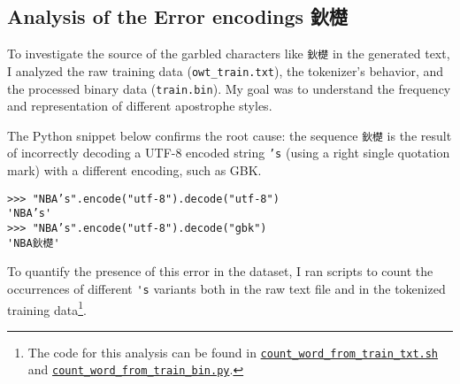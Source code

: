 \subsection{Analysis of the Error encodings 鈥檚}
\label{appendix:error-encoding}

To investigate the source of the garbled characters like \lstinline{鈥檚} in the generated text, I analyzed the raw training data (\lstinline{owt_train.txt}), the tokenizer's behavior, and the processed binary data (\lstinline{train.bin}). My goal was to understand the frequency and representation of different apostrophe styles.

The Python snippet below confirms the root cause: the sequence \lstinline{鈥檚} is the result of incorrectly decoding a UTF-8 encoded string \lstinline{’s} (using a right single quotation mark) with a different encoding, such as GBK.

\begin{lstlisting}
>>> "NBA’s".encode("utf-8").decode("utf-8")
'NBA’s'
>>> "NBA’s".encode("utf-8").decode("gbk")
'NBA鈥檚'
\end{lstlisting}

To quantify the presence of this error in the dataset, I ran scripts to count the occurrences of different \lstinline{'s} variants both in the raw text file and in the tokenized training data\footnote{The code for this analysis can be found in \href{https://github.com/donglinkang2021/assignment1-basics/blob/main/data_utils/count_word_from_train_txt.sh}{\lstinline{count_word_from_train_txt.sh}} and \href{https://github.com/donglinkang2021/assignment1-basics/blob/main/data_utils/count_word_from_train_bin.py}{\lstinline{count_word_from_train_bin.py}}.}.

